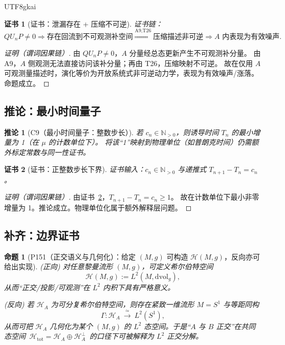 \documentclass[12pt]{article}
\newtheorem{proposition}{命题}[section]
\newtheorem{corollary}{推论}[section]
\newtheorem{Certificate}{证书}[section]
\begin{document}
\begin{CJK*}{UTF8}{gkai}
\begin{Certificate}[证书：泄漏存在 + 压缩不可逆]
\label{cert:P13}
证书链：
\[
Q U_n P\neq 0
\Rightarrow
\text{存在回流到不可观测补空间}
\overset{\text{A9,T26}}{\Longrightarrow}
\text{压缩描述非可逆}
\Rightarrow
\text{$A$ 内表现为有效噪声}.
\]
\end{Certificate}

\begin{proof}[证明（谓词因果链）]
由 $Q U_n P\neq 0$，$A$ 分量经总态更新产生不可观测补分量。
由 A9，$A$ 侧观测无法直接访问该补分量；再由 T26，压缩映射不可逆。
故在仅用 $A$ 可观测量描述时，演化等价为开放系统式非可逆动力学，表现为有效噪声/涨落。命题成立。
\end{proof}

\subsection{推论：最小时间量子}

\begin{corollary}[C9（最小时间量子：整数步长）]
\label{cor:C9}
若 $c_n\in\mathbb N_{>0}$，则诱导时间 $T_n$ 的最小增量为 1（在 $\mu$ 的计数单位下）。
将该“1”映射到物理单位（如普朗克时间）仍需额外标定常数与同一性证书。
\end{corollary}

\begin{Certificate}[证书：正整数步长下界]
\label{cert:C9}
证书输入：$c_n\in\mathbb N_{>0}$ 与递推式 $T_{n+1}-T_n=c_n$。
\end{Certificate}

\begin{proof}[证明（谓词因果链）]
由证书~\ref{cert:C9}，$T_{n+1}-T_n=c_n\ge 1$。
故在计数单位下最小非零增量为 1。推论成立。物理单位化属于额外解释层问题。
\end{proof}

\subsection{补齐：边界证书}

\begin{proposition}[P151（正交语义与几何化）：给定 $(M,g)$ 可构造 $\mathcal H(M,g)$，反向亦可给出实现]
\label{prop:P20}
(正向) 对任意黎曼流形 $(M,g)$，可定义希尔伯特空间
\[
\mathcal H(M,g):=L^2(M,\mathrm{dvol}_g),
\]
从而“正交/投影/可观测”在 $L^2$ 内积下具有严格意义。

(反向) 若 $\mathcal H_A$ 为可分复希尔伯特空间，则存在紧致一维流形 $M=S^1$ 与等距同构
\[
\Gamma:\mathcal H_A\ \xrightarrow{\ \simeq\ }\ L^2(S^1),
\]
从而可把 $\mathcal H_A$ 几何化为某个 $(M,g)$ 的 $L^2$ 态空间。于是“$A$ 与 $B$ 正交”在共同态空间 $\,\mathcal H_{\mathrm{tot}}=\mathcal
  H_A\oplus\mathcal H_A^\perp\,$ 的口径下可被解释为 $L^2$ 正交分解。
\end{proposition}


\end{CJK*}
\end{document}
